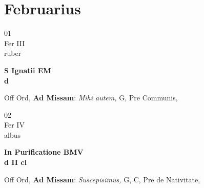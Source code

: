 \documentclass[10pt, openany]{book}
\begin{document}
        \chapter{Februarius}
                        
        \begin{center}
            \begin{minipage}{3.5in}
                \vspace{2em}
                \begin{minipage}{0.5in}
                    {\Huge 01} \\
                    {\normalsize Fer III} \\
                    {\normalsize ruber}
                \end{minipage}
                \begin{minipage}{3.0in}
                    \textbf{ \large S Ignatii EM \\
                    \textnormal{\normalsize d}} \\ 
                \end{minipage}
                \begin{justify}Off Ord, \textbf{Ad Missam}: \textit{Mihi autem,} G, Pre Communis,  
                \end{justify}
            \end{minipage}
        \end{center}
    
        \begin{center}
            \begin{minipage}{3.5in}
                \vspace{2em}
                \begin{minipage}{0.5in}
                    {\Huge 02} \\
                    {\normalsize Fer IV} \\
                    {\normalsize albus}
                \end{minipage}
                \begin{minipage}{3.0in}
                    \textbf{ \large In Purificatione BMV \\
                    \textnormal{\normalsize d II cl}} \\ 
                \end{minipage}
                \begin{justify}Off Ord, \textbf{Ad Missam}: \textit{Suscepisimus,} G, C, Pre de Nativitate,  
                \end{justify}
            \end{minipage}
        \end{center}
    
\end{document}
